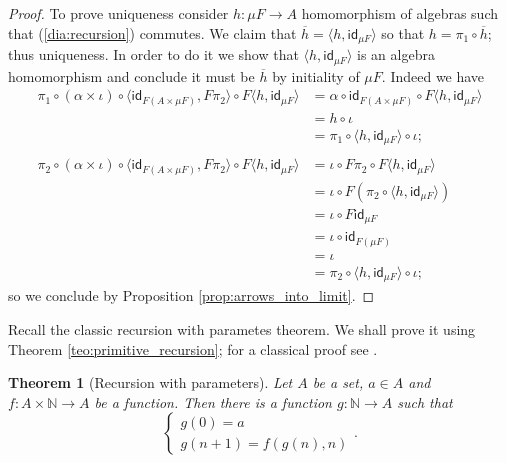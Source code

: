 \documentclass[letterpaper, 11pt, oneside]{memoir}
\theoremstyle{myteo}
\newtheorem{theorem}{Theorem}[section]
\numberwithin{equation}{section}
\newcommand{\id}{\textsf{id}}
\newcommand{\N}{\mathbb{N}}
\newcommand{\intoprod}[2]{{\langle #1, #2\rangle}}
\begin{document}
\begin{proof}
  To prove uniqueness consider \(h \colon \mu F \to A\) homomorphism of algebras such that (\ref{dia:recursion}) commutes.
  We claim that \(\overline{h} = \intoprod{h}{\id_{\mu F}}\) so that \(h = \pi_1 \circ \overline{h}\); thus uniqueness.
  In order to do it we show that \(\intoprod{h}{\id_{\mu F}}\) is an algebra homomorphism and conclude it must be \(\overline{h}\) by initiality of \(\mu F\).
  Indeed we have
  \begin{align*}
    \pi_1 \circ (\alpha \times \iota) \circ \intoprod{\id_{F(A \times \mu F)}}{F\pi_2} \circ F\intoprod{h}{\id_{\mu F}}
    &= \alpha \circ \id_{F(A \times \mu F)} \circ F\intoprod{h}{\id_{\mu F}} \\
    &= h \circ \iota\\
    &= \pi_1 \circ \intoprod{h}{\id_{\mu F}} \circ \iota;\\
    &\\
    \pi_2 \circ (\alpha \times \iota) \circ \intoprod{\id_{F(A \times \mu F)}}{F\pi_2} \circ F\intoprod{h}{\id_{\mu F}}
    &= \iota \circ F\pi_2 \circ F\intoprod{h}{\id_{\mu F}}\\
    &= \iota \circ F(\pi_2 \circ \intoprod{h}{\id_{\mu F}})\\
    &= \iota \circ F\id_{\mu F}\\
    &= \iota \circ \id_{F(\mu F)}\\
    &= \iota\\
    &= \pi_2 \circ \intoprod{h}{\id_{\mu F}} \circ \iota;
  \end{align*}
  so we conclude by Proposition \ref{prop:arrows_into_limit}.
\end{proof}

Recall the classic recursion with parametes theorem.
We shall prove it using Theorem \ref{teo:primitive_recursion}; for a classical proof see \cite[Theorem 18.1]{andrettaelements}.

\begin{theorem}[Recursion with parameters]
  Let \(A\) be a set, \(a \in A\) and \(f \colon A \times \N \to A\) be a function.
  Then there is a function \(g \colon \N \to A\) such that
  \begin{equation*}
    \begin{cases}
      g(0) = a \\
      g(n + 1) = f(g(n), n)
    \end{cases}.
  \end{equation*}
\end{theorem}
\end{document}
